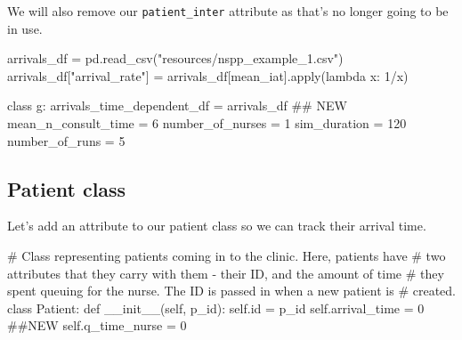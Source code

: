 \documentclass[
  letterpaper,
  DIV=11,
  numbers=noendperiod]{scrreprt}
\newenvironment{Shaded}{}{}
\newcommand{\BuiltInTok}[1]{\textcolor[rgb]{0.84,0.23,0.29}{#1}}
\newcommand{\CommentTok}[1]{\textcolor[rgb]{0.42,0.45,0.49}{#1}}
\newcommand{\DecValTok}[1]{\textcolor[rgb]{0.00,0.36,0.77}{#1}}
\newcommand{\FunctionTok}[1]{\textcolor[rgb]{0.44,0.26,0.76}{#1}}
\newcommand{\KeywordTok}[1]{\textcolor[rgb]{0.84,0.23,0.29}{#1}}
\newcommand{\NormalTok}[1]{\textcolor[rgb]{0.14,0.16,0.18}{#1}}
\newcommand{\OperatorTok}[1]{\textcolor[rgb]{0.14,0.16,0.18}{#1}}
\newcommand{\StringTok}[1]{\textcolor[rgb]{0.01,0.18,0.38}{#1}}
\newcommand{\VariableTok}[1]{\textcolor[rgb]{0.89,0.38,0.04}{#1}}
\begin{document}
We will also remove our \texttt{patient\_inter} attribute as that's no
longer going to be in use.

\begin{Shaded}
\begin{Highlighting}[]
\NormalTok{arrivals\_df }\OperatorTok{=}\NormalTok{ pd.read\_csv(}\StringTok{"resources/nspp\_example\_1.csv"}\NormalTok{)}
\NormalTok{arrivals\_df[}\StringTok{"arrival\_rate"}\NormalTok{] }\OperatorTok{=}\NormalTok{ arrivals\_df[}\StringTok{\textquotesingle{}mean\_iat\textquotesingle{}}\NormalTok{].}\BuiltInTok{apply}\NormalTok{(}\KeywordTok{lambda}\NormalTok{ x: }\DecValTok{1}\OperatorTok{/}\NormalTok{x)}

\KeywordTok{class}\NormalTok{ g:}
\NormalTok{    arrivals\_time\_dependent\_df }\OperatorTok{=}\NormalTok{ arrivals\_df  }\CommentTok{\#\# NEW}
\NormalTok{    mean\_n\_consult\_time }\OperatorTok{=} \DecValTok{6}
\NormalTok{    number\_of\_nurses }\OperatorTok{=} \DecValTok{1}
\NormalTok{    sim\_duration }\OperatorTok{=} \DecValTok{120}
\NormalTok{    number\_of\_runs }\OperatorTok{=} \DecValTok{5}
\end{Highlighting}
\end{Shaded}

\subsection{Patient class}\label{patient-class-1}

Let's add an attribute to our patient class so we can track their
arrival time.

\begin{Shaded}
\begin{Highlighting}[]
\CommentTok{\# Class representing patients coming in to the clinic.  Here, patients have}
\CommentTok{\# two attributes that they carry with them {-} their ID, and the amount of time}
\CommentTok{\# they spent queuing for the nurse.  The ID is passed in when a new patient is}
\CommentTok{\# created.}
\KeywordTok{class}\NormalTok{ Patient:}
    \KeywordTok{def} \FunctionTok{\_\_init\_\_}\NormalTok{(}\VariableTok{self}\NormalTok{, p\_id):}
        \VariableTok{self}\NormalTok{.}\BuiltInTok{id} \OperatorTok{=}\NormalTok{ p\_id}
        \VariableTok{self}\NormalTok{.arrival\_time }\OperatorTok{=} \DecValTok{0} \CommentTok{\#\#NEW}
        \VariableTok{self}\NormalTok{.q\_time\_nurse }\OperatorTok{=} \DecValTok{0}
\end{Highlighting}
\end{Shaded}
\end{document}
